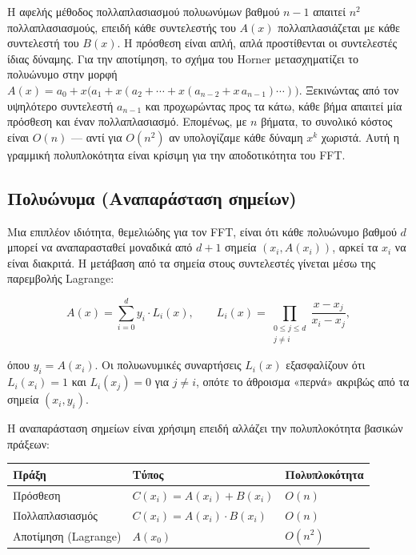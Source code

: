 \documentclass[a4paper, 11pt]{article}
\begin{document}
Η αφελής μέθοδος πολλαπλασιασμού πολυωνύμων βαθμού \(n-1\) απαιτεί
\(n^2\) πολλαπλασιασμούς, επειδή κάθε συντελεστής του \(A(x)\)
πολλαπλασιάζεται με κάθε συντελεστή του \(B(x)\). Η πρόσθεση είναι απλή,
απλά προστίθενται οι συντελεστές ίδιας δύναμης. Για την αποτίμηση, το
σχήμα του Horner μετασχηματίζει το πολυώνυμο στην μορφή
\(A(x) = a_0 + x\bigl(a_1 + x(a_2 + \cdots + x(a_{n-2} + x\,a_{n-1})\cdots)\bigr)\).
Ξεκινώντας από τον υψηλότερο συντελεστή \(a_{n-1}\) και προχωρώντας προς
τα κάτω, κάθε βήμα απαιτεί μία πρόσθεση και έναν πολλαπλασιασμό.
Επομένως, με \(n\) βήματα, το συνολικό κόστος είναι \(O(n)\) --- αντί
για \(O(n^2)\) αν υπολογίζαμε κάθε δύναμη \(x^k\) χωριστά. Αυτή η
γραμμική πολυπλοκότητα είναι κρίσιμη για την αποδοτικότητα του FFT.

\subsection{Πολυώνυμα (Αναπαράσταση
σημείων)}\label{ux3c0ux3bfux3bbux3c5ux3ceux3bdux3c5ux3bcux3b1-ux3b1ux3bdux3b1ux3c0ux3b1ux3c1ux3acux3c3ux3c4ux3b1ux3c3ux3b7-ux3c3ux3b7ux3bcux3b5ux3afux3c9ux3bd}

Μια επιπλέον ιδιότητα, θεμελιώδης για τον FFT, είναι ότι κάθε πολυώνυμο
βαθμού \(d\) μπορεί να αναπαρασταθεί μοναδικά από \(d+1\) σημεία
\((x_i, A(x_i))\), αρκεί τα \(x_i\) να είναι διακριτά. Η μετάβαση από τα
σημεία στους συντελεστές γίνεται μέσω της παρεμβολής Lagrange:

\[
A(x) = \sum_{i=0}^{d} y_i \cdot L_i(x), \qquad
L_i(x) = \prod_{\substack{0 \le j \le d \\ j \ne i}} \frac{x - x_j}{x_i - x_j},
\]

όπου \(y_i = A(x_i)\). Οι πολυωνυμικές συναρτήσεις \(L_i(x)\)
εξασφαλίζουν ότι \(L_i(x_i)=1\) και \(L_i(x_j)=0\) για \(j \ne i\),
οπότε το άθροισμα «περνά» ακριβώς από τα σημεία \((x_i, y_i)\).

Η αναπαράσταση σημείων είναι χρήσιμη επειδή αλλάζει την πολυπλοκότητα
βασικών πράξεων:

\begin{longtable}[]{@{}lll@{}}
\toprule\noalign{}
Πράξη & Τύπος & Πολυπλοκότητα \\
\midrule\noalign{}
\endhead
\bottomrule\noalign{}
\endlastfoot
Πρόσθεση & \(C(x_i) = A(x_i) + B(x_i)\) & \(O(n)\) \\
Πολλαπλασιασμός & \(C(x_i) = A(x_i) \cdot B(x_i)\) & \(O(n)\) \\
Αποτίμηση (Lagrange) & \(A(x_0)\) & \(O(n^2)\) \\
\end{longtable}
\end{document}
